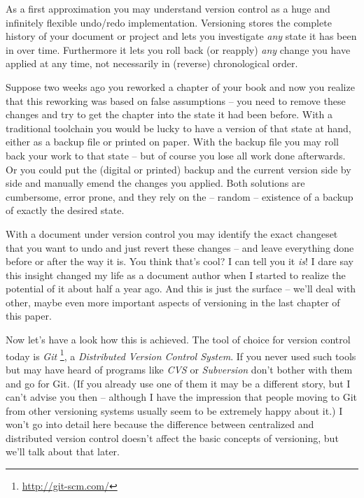 \documentclass[../../LilyPond-Tutorials]{subfiles}
\begin{document}
As a first approximation you may understand version control as a huge and infinitely flexible undo/redo implementation.
Versioning stores the complete history of your document or project and lets you investigate \emph{any} state it has been in over time.
Furthermore it lets you roll back (or reapply) \emph{any} change you have applied at any time, not necessarily in (reverse) chronological order.

Suppose two weeks ago you reworked a chapter of your book and now you realize that this reworking was based on false assumptions -- you need to remove these changes and try to get the chapter into the state it had been before.
With a traditional toolchain you would be lucky to have a version of that state at hand, either as a backup file or printed on paper.
With the backup file you may roll back your work to that state -- but of course you lose all work done afterwards.
Or you could put the (digital or printed) backup and the current version side by side and manually emend the changes you applied.
Both solutions are cumbersome, error prone, and they rely on the -- random -- existence of a backup of exactly the desired state.

With a document under version control you may identify the exact changeset that you want to undo and just revert these changes -- and leave everything done before or after the way it is.
You think that's cool? I can tell you it \emph{is}!
I dare say this insight changed my life as a document author when I started to realize the potential of it about half a year ago.
And this is just the surface -- we'll deal with other, maybe even more important aspects of versioning in the last chapter of this paper.

\medskip
Now let's have a look how this is achieved.
The tool of choice for version control today is \emph{Git}%
\footnote{\url{http://git-scm.com/}},
a \emph{Distributed Version Control System}.
If you never used such tools but may have heard of programs like \emph{CVS} or \emph{Subversion} don't bother with them and go for Git.
(If you already use one of them it may be a different story, but I can't advise you then -- although I have the impression that people moving to Git from other versioning systems usually seem to be extremely happy about it.)
I won't go into detail here because the difference between centralized and distributed version control doesn't affect the basic concepts of versioning, but we'll talk about that later.
\end{document}
